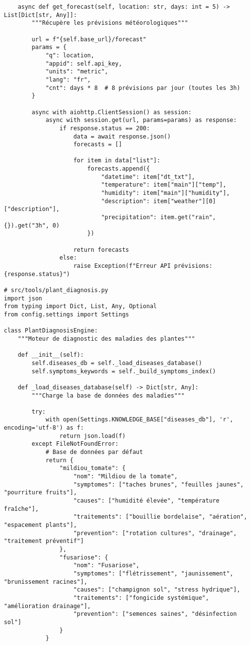 \begin{verbatim}
    async def get_forecast(self, location: str, days: int = 5) -> List[Dict[str, Any]]:
        """Récupère les prévisions météorologiques"""

        url = f"{self.base_url}/forecast"
        params = {
            "q": location,
            "appid": self.api_key,
            "units": "metric",
            "lang": "fr",
            "cnt": days * 8  # 8 prévisions par jour (toutes les 3h)
        }

        async with aiohttp.ClientSession() as session:
            async with session.get(url, params=params) as response:
                if response.status == 200:
                    data = await response.json()
                    forecasts = []

                    for item in data["list"]:
                        forecasts.append({
                            "datetime": item["dt_txt"],
                            "temperature": item["main"]["temp"],
                            "humidity": item["main"]["humidity"],
                            "description": item["weather"][0]["description"],
                            "precipitation": item.get("rain", {}).get("3h", 0)
                        })

                    return forecasts
                else:
                    raise Exception(f"Erreur API prévisions: {response.status}")

# src/tools/plant_diagnosis.py
import json
from typing import Dict, List, Any, Optional
from config.settings import Settings

class PlantDiagnosisEngine:
    """Moteur de diagnostic des maladies des plantes"""

    def __init__(self):
        self.diseases_db = self._load_diseases_database()
        self.symptoms_keywords = self._build_symptoms_index()

    def _load_diseases_database(self) -> Dict[str, Any]:
        """Charge la base de données des maladies"""

        try:
            with open(Settings.KNOWLEDGE_BASE["diseases_db"], 'r', encoding='utf-8') as f:
                return json.load(f)
        except FileNotFoundError:
            # Base de données par défaut
            return {
                "mildiou_tomate": {
                    "nom": "Mildiou de la tomate",
                    "symptomes": ["taches brunes", "feuilles jaunes", "pourriture fruits"],
                    "causes": ["humidité élevée", "température fraîche"],
                    "traitements": ["bouillie bordelaise", "aération", "espacement plants"],
                    "prevention": ["rotation cultures", "drainage", "traitement préventif"]
                },
                "fusariose": {
                    "nom": "Fusariose",
                    "symptomes": ["flétrissement", "jaunissement", "brunissement racines"],
                    "causes": ["champignon sol", "stress hydrique"],
                    "traitements": ["fongicide systémique", "amélioration drainage"],
                    "prevention": ["semences saines", "désinfection sol"]
                }
            }


\end{verbatim}
